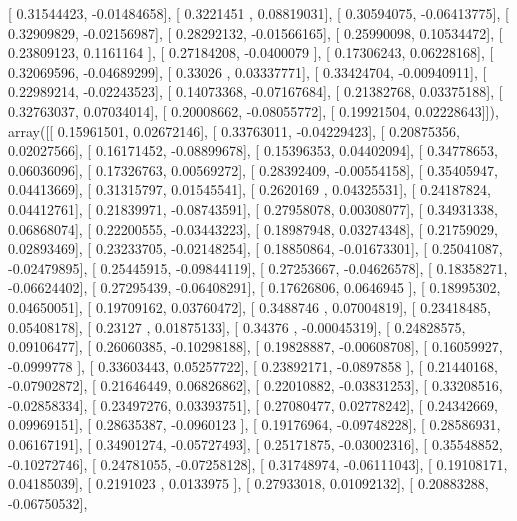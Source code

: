 \documentclass{article}
\begin{document}
       [ 0.31544423, -0.01484658],
       [ 0.3221451 ,  0.08819031],
       [ 0.30594075, -0.06413775],
       [ 0.32909829, -0.02156987],
       [ 0.28292132, -0.01566165],
       [ 0.25990098,  0.10534472],
       [ 0.23809123,  0.1161164 ],
       [ 0.27184208, -0.0400079 ],
       [ 0.17306243,  0.06228168],
       [ 0.32069596, -0.04689299],
       [ 0.33026   ,  0.03337771],
       [ 0.33424704, -0.00940911],
       [ 0.22989214, -0.02243523],
       [ 0.14073368, -0.07167684],
       [ 0.21382768,  0.03375188],
       [ 0.32763037,  0.07034014],
       [ 0.20008662, -0.08055772],
       [ 0.19921504,  0.02228643]]), array([[ 0.15961501,  0.02672146],
       [ 0.33763011, -0.04229423],
       [ 0.20875356,  0.02027566],
       [ 0.16171452, -0.08899678],
       [ 0.15396353,  0.04402094],
       [ 0.34778653,  0.06036096],
       [ 0.17326763,  0.00569272],
       [ 0.28392409, -0.00554158],
       [ 0.35405947,  0.04413669],
       [ 0.31315797,  0.01545541],
       [ 0.2620169 ,  0.04325531],
       [ 0.24187824,  0.04412761],
       [ 0.21839971, -0.08743591],
       [ 0.27958078,  0.00308077],
       [ 0.34931338,  0.06868074],
       [ 0.22200555, -0.03443223],
       [ 0.18987948,  0.03274348],
       [ 0.21759029,  0.02893469],
       [ 0.23233705, -0.02148254],
       [ 0.18850864, -0.01673301],
       [ 0.25041087, -0.02479895],
       [ 0.25445915, -0.09844119],
       [ 0.27253667, -0.04626578],
       [ 0.18358271, -0.06624402],
       [ 0.27295439, -0.06408291],
       [ 0.17626806,  0.0646945 ],
       [ 0.18995302,  0.04650051],
       [ 0.19709162,  0.03760472],
       [ 0.3488746 ,  0.07004819],
       [ 0.23418485,  0.05408178],
       [ 0.23127   ,  0.01875133],
       [ 0.34376   , -0.00045319],
       [ 0.24828575,  0.09106477],
       [ 0.26060385, -0.10298188],
       [ 0.19828887, -0.00608708],
       [ 0.16059927, -0.0999778 ],
       [ 0.33603443,  0.05257722],
       [ 0.23892171, -0.0897858 ],
       [ 0.21440168, -0.07902872],
       [ 0.21646449,  0.06826862],
       [ 0.22010882, -0.03831253],
       [ 0.33208516, -0.02858334],
       [ 0.23497276,  0.03393751],
       [ 0.27080477,  0.02778242],
       [ 0.24342669,  0.09969151],
       [ 0.28635387, -0.0960123 ],
       [ 0.19176964, -0.09748228],
       [ 0.28586931,  0.06167191],
       [ 0.34901274, -0.05727493],
       [ 0.25171875, -0.03002316],
       [ 0.35548852, -0.10272746],
       [ 0.24781055, -0.07258128],
       [ 0.31748974, -0.06111043],
       [ 0.19108171,  0.04185039],
       [ 0.2191023 ,  0.0133975 ],
       [ 0.27933018,  0.01092132],
       [ 0.20883288, -0.06750532],
\end{document}
